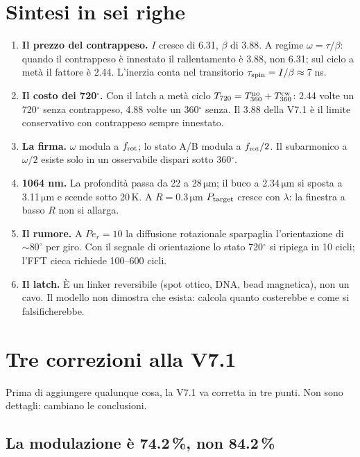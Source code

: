 \documentclass[11pt,a4paper]{article}
\providecommand{\micro}{}
\renewcommand{\micro}{\ensuremath{\mathrm{\mu}}}
\begin{document}
\section*{Sintesi in sei righe}
\begin{enumerate}\itemsep2pt
\item \textbf{Il prezzo del contrappeso.} $I$ cresce di 6.31, $\beta$ di
3.88. A regime $\omega=\tau/\beta$: quando il contrappeso è innestato il
rallentamento è 3.88, non 6.31; sul ciclo a metà il fattore è 2.44.
L'inerzia conta nel transitorio $\tau_{\rm spin}=I/\beta\approx 7$\,ns.
\item \textbf{Il costo dei 720$^\circ$.} Con il latch a metà ciclo
$T_{720}=T_{360}^{\rm no}+T_{360}^{\rm cw}$: 2.44 volte un 720$^\circ$ senza
contrappeso, 4.88 volte un 360$^\circ$ senza. Il 3.88 della V7.1 è il limite
conservativo con contrappeso sempre innestato.
\item \textbf{La firma.} $\omega$ modula a $f_{\rm rot}$; lo stato A/B modula
a $f_{\rm rot}/2$. Il subarmonico a $\omega/2$ esiste solo in un osservabile
dispari sotto 360$^\circ$.
\item \textbf{1064 nm.} La profondità passa da 22 a 28\,$\micro$m; il buco a
2.34\,$\micro$m si sposta a 3.11\,$\micro$m e scende sotto 20\,K. A
$R=0.3\,\micro$m $P_{\rm target}$ cresce con $\lambda$: la finestra a basso
$R$ non si allarga.
\item \textbf{Il rumore.} A $Pe_r=10$ la diffusione rotazionale sparpaglia
l'orientazione di $\sim 80^\circ$ per giro. Con il segnale di orientazione lo
stato 720$^\circ$ si ripiega in 10 cicli; l'FFT cieca richiede 100--600 cicli.
\item \textbf{Il latch.} È un linker reversibile (spot ottico, DNA, bead
magnetica), non un cavo. Il modello non dimostra che esista: calcola quanto
costerebbe e come si falsificherebbe.
\end{enumerate}

\section{Tre correzioni alla V7.1}
\label{sec:correzioni}

Prima di aggiungere qualunque cosa, la V7.1 va corretta in tre punti. Non
sono dettagli: cambiano le conclusioni.

\subsection{La modulazione è 74.2\,\%, non 84.2\,\%}
\end{document}
